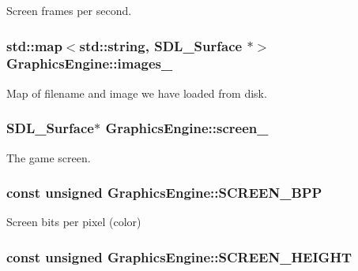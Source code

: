 Screen frames per second. 

\hypertarget{classGraphicsEngine_a5058ffe9d65389df4207db6be00ac889}{
\subsubsection[{images\-\_\-}]{\setlength{\rightskip}{0pt plus 5cm}std\-::map$<$std\-::string, S\-D\-L\-\_\-\-Surface $\ast$$>$ Graphics\-Engine\-::images\-\_\-\hspace{0.3cm}{\ttfamily [private]}}}\label{classGraphicsEngine_a5058ffe9d65389df4207db6be00ac889}


Map of filename and image we have loaded from disk. 

\hypertarget{classGraphicsEngine_a4d89c081a99c7512a070c9cb77809322}{
\subsubsection[{screen\-\_\-}]{\setlength{\rightskip}{0pt plus 5cm}S\-D\-L\-\_\-\-Surface$\ast$ Graphics\-Engine\-::screen\-\_\-\hspace{0.3cm}{\ttfamily [private]}}}\label{classGraphicsEngine_a4d89c081a99c7512a070c9cb77809322}


The game screen. 

\hypertarget{classGraphicsEngine_a3ff7024552553e73dd9edaef063284e0}{
\subsubsection[{S\-C\-R\-E\-E\-N\-\_\-\-B\-P\-P}]{\setlength{\rightskip}{0pt plus 5cm}const unsigned Graphics\-Engine\-::\-S\-C\-R\-E\-E\-N\-\_\-\-B\-P\-P\hspace{0.3cm}{\ttfamily [private]}}}\label{classGraphicsEngine_a3ff7024552553e73dd9edaef063284e0}


Screen bits per pixel (color) 

\hypertarget{classGraphicsEngine_a22ccc86caef4284dcf8600ef846e3897}{
\subsubsection[{S\-C\-R\-E\-E\-N\-\_\-\-H\-E\-I\-G\-H\-T}]{\setlength{\rightskip}{0pt plus 5cm}const unsigned Graphics\-Engine\-::\-S\-C\-R\-E\-E\-N\-\_\-\-H\-E\-I\-G\-H\-T\hspace{0.3cm}{\ttfamily [private]}}}\label{classGraphicsEngine_a22ccc86caef4284dcf8600ef846e3897}


